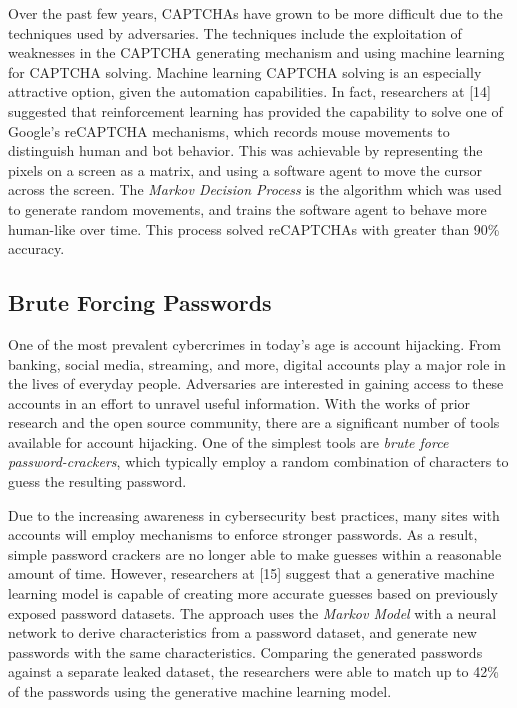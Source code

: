 \documentclass[11pt,conference]{IEEEtran}
\begin{document}
Over the past few years, CAPTCHAs have grown to be more difficult due to the
techniques used by adversaries. The techniques include the exploitation of
weaknesses in the CAPTCHA generating mechanism
and using machine learning for CAPTCHA solving. Machine learning
CAPTCHA solving is an especially attractive option, given the automation
capabilities. In fact, researchers at [14] suggested that reinforcement learning has
provided the capability to solve one of Google's reCAPTCHA mechanisms, which
records mouse movements to distinguish human and bot behavior. This was
achievable by representing the pixels on a screen as a matrix, and using a
software agent to move the
cursor across the screen. The \emph{Markov
Decision Process} is the algorithm which was used to generate random movements,
and trains the software agent to behave more human-like over time. This
process solved reCAPTCHAs with greater than 90\% accuracy.

\subsection{Brute Forcing Passwords}
One of the most prevalent cybercrimes in today's age is account hijacking. From
banking, social media, streaming, and more, digital accounts play a major role
in the lives of everyday people. Adversaries are interested in
gaining access to these accounts in an effort to unravel useful information.
With the works of prior research and the open source community, there are a
significant number of tools available for account hijacking. One of the
simplest tools are \emph{brute force password-crackers}, which typically employ a random
combination of characters to guess the resulting password.

Due to the increasing awareness in cybersecurity best practices, many sites
with accounts will employ mechanisms to enforce stronger passwords. As a
result, simple password crackers are no longer able to make guesses 
within a reasonable amount of time. However, researchers at [15] suggest that a
generative machine learning model is capable of creating more accurate guesses
based on previously exposed password datasets. The approach uses the
\emph{Markov Model} with a neural network to derive characteristics from a
password dataset, and generate new passwords with the same characteristics.
Comparing the generated passwords against a separate leaked dataset, the
researchers were able to match up to 42\% of the passwords using the generative
machine learning model.
\end{document}

